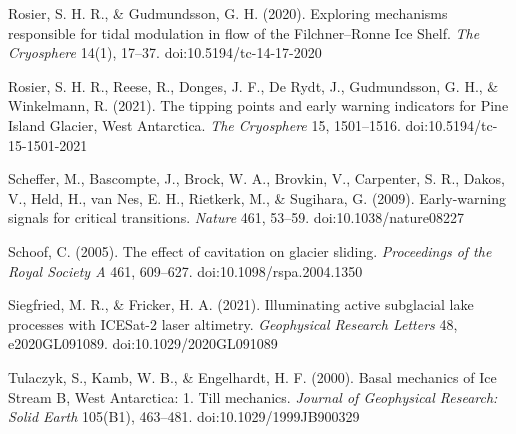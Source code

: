 \documentclass[11pt]{article}
\begin{document}
Rosier, S. H. R., \& Gudmundsson, G. H. (2020). Exploring mechanisms responsible for tidal modulation in flow of the Filchner–Ronne Ice Shelf. \emph{The Cryosphere} 14(1), 17–37. doi:10.5194/tc-14-17-2020

Rosier, S. H. R., Reese, R., Donges, J. F., De Rydt, J., Gudmundsson, G. H., \& Winkelmann, R. (2021). The tipping points and early warning indicators for Pine Island Glacier, West Antarctica. \emph{The Cryosphere} 15, 1501–1516. doi:10.5194/tc-15-1501-2021


Scheffer, M., Bascompte, J., Brock, W. A., Brovkin, V., Carpenter, S. R., Dakos, V., Held, H., van Nes, E. H., Rietkerk, M., \& Sugihara, G. (2009). Early-warning signals for critical transitions. \emph{Nature} 461, 53–59. doi:10.1038/nature08227


Schoof, C. (2005). The effect of cavitation on glacier sliding. \emph{Proceedings of the Royal Society A} 461, 609–627. doi:10.1098/rspa.2004.1350


Siegfried, M. R., \& Fricker, H. A. (2021). Illuminating active subglacial lake processes with ICESat-2 laser altimetry. \emph{Geophysical Research Letters} 48, e2020GL091089. doi:10.1029/2020GL091089


Tulaczyk, S., Kamb, W. B., \& Engelhardt, H. F. (2000). Basal mechanics of Ice Stream B, West Antarctica: 1. Till mechanics. \emph{Journal of Geophysical Research: Solid Earth} 105(B1), 463–481. doi:10.1029/1999JB900329
\end{document}
